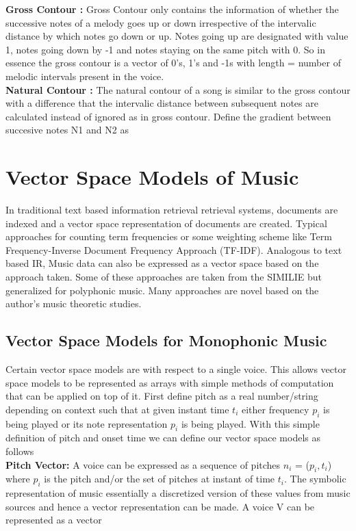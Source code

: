 \noindent \textbf{Gross Contour : } Gross Contour only contains the information of whether the successive notes of a melody goes up or down irrespective of the intervalic distance by which notes go down or up. Notes going up are designated with value 1, notes going down by -1 and notes staying on the same pitch with 0. So in essence the gross contour is a vector of 0's, 1's and -1s with length = number of melodic intervals present in the voice.\\

\noindent \textbf{Natural Contour : } The natural contour of a song is similar to the gross contour with a difference that the intervalic distance between subsequent notes are calculated instead of ignored as in gross contour. Define the gradient between succesive notes N1 and N2 as 


\section{Vector Space Models of Music}

\noindent In traditional text based information retrieval retrieval systems, documents are indexed and a vector space representation of documents are created. Typical approaches for counting term frequencies or some weighting scheme like Term Frequency-Inverse Document Frequency Approach (TF-IDF). Analogous to text based IR, Music data can also be expressed as a vector space based on the approach taken. Some of these approaches are taken from the SIMILIE \cite{similietechnicalmanual} but generalized for polyphonic music. Many approaches are novel based on the author's music theoretic studies. 

\subsection{Vector Space Models for Monophonic Music}

\noindent Certain vector space models are with respect to a single voice. This allows vector space models to be represented as arrays with simple methods of computation that can be applied on top of it. First define pitch as a real number/string depending on context such that at given instant time $t_i$ either frequency $p_i$ is being played or its note representation $p_i$ is being played. With this simple definition of pitch and onset time we can define our vector space models as follows\\
 
\noindent \textbf{Pitch Vector:} A voice can be expressed as a sequence of pitches $n_i$ = ($p_i, t_i$) where $p_i$ is the pitch and/or the set of pitches at instant of time $t_i$. The symbolic representation of music essentially a discretized version of these values from music sources and hence a vector representation can be made. A voice V can be represented as a vector

